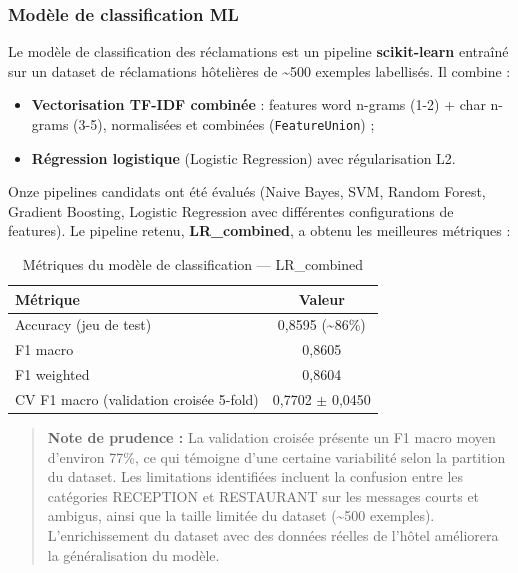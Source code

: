 \subsubsection{Modèle de classification ML}

Le modèle de classification des réclamations est un pipeline \textbf{scikit-learn} entraîné sur un dataset de réclamations hôtelières de \textasciitilde{}500 exemples labellisés. Il combine :

\begin{itemize}
  \item \textbf{Vectorisation TF-IDF combinée} : features word n-grams (1-2) + char n-grams (3-5), normalisées et combinées (\texttt{FeatureUnion}) ;
  \item \textbf{Régression logistique} (Logistic Regression) avec régularisation L2.
\end{itemize}

Onze pipelines candidats ont été évalués (Naive Bayes, SVM, Random Forest, Gradient Boosting, Logistic Regression avec différentes configurations de features). Le pipeline retenu, \textbf{LR\_combined}, a obtenu les meilleures métriques :

\begin{table}[H]
\centering
\caption{Métriques du modèle de classification — LR\_combined}
\label{tab:metriques_ml}
\begin{tabular}{|l|c|}
\hline
\textbf{Métrique} & \textbf{Valeur} \\
\hline
Accuracy (jeu de test) & 0,8595 (\textasciitilde{}86\%) \\
\hline
F1 macro & 0,8605 \\
\hline
F1 weighted & 0,8604 \\
\hline
CV F1 macro (validation croisée 5-fold) & 0,7702 $\pm$ 0,0450 \\
\hline
\end{tabular}
\end{table}

\begin{quote}
\textbf{Note de prudence :} La validation croisée présente un F1 macro moyen d'environ 77\%, ce qui témoigne d'une certaine variabilité selon la partition du dataset. Les limitations identifiées incluent la confusion entre les catégories RECEPTION et RESTAURANT sur les messages courts et ambigus, ainsi que la taille limitée du dataset (\textasciitilde{}500 exemples). L'enrichissement du dataset avec des données réelles de l'hôtel améliorera la généralisation du modèle.
\end{quote}

